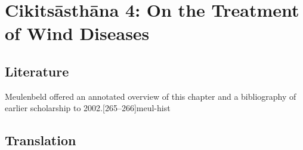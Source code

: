 
\chapter{Cikitsāsthāna  4:  On the Treatment of Wind 
    Diseases}

\section{Literature} 

Meulenbeld offered an annotated overview of this chapter and a bibliography
of earlier scholarship to 2002.[265--266]{meul-hist} 

\section{Translation}


